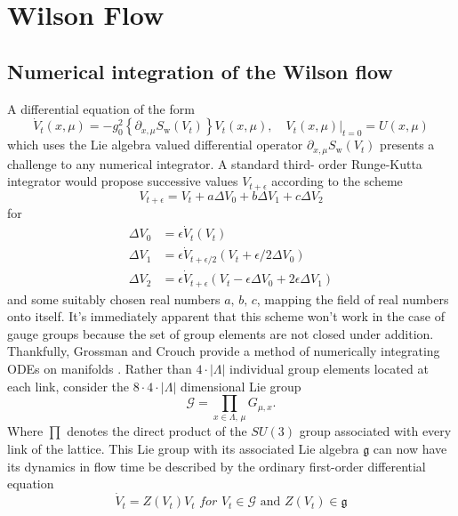 \documentclass[a4paper,10pt]{book}
\begin{document}
\section{Wilson Flow}

\subsection{Numerical integration of the Wilson flow}
A differential equation of the form 
\begin{equation}\label{eq:WF_diffeq}
\dot{V}_{t}(x, \mu)=-g_{0}^{2}\left\{\partial_{x, \mu} S_{\mathrm{w}}\left(V_{t}\right)\right\} V_{t}(x, \mu),\left.\quad V_{t}(x, \mu)\right|_{t=0}=U(x, \mu)
\end{equation}
which uses the Lie algebra valued differential operator $\partial_{x, \mu} S_{\mathrm{w}}\left(V_{t}\right)$ presents a challenge to any numerical integrator. A standard third- order Runge-Kutta integrator would  propose successive values $V_{t+\epsilon}$ according to the scheme 
$$
V_{t+\epsilon} = V_{t}+a\Delta V_0+b\Delta V_1 + c\Delta V_2
$$
for
\begin{equation*}
\begin{aligned} 
\Delta V_0 &= \epsilon \dot{V}_{t}\left( V_{t} \right)\\
\Delta V_1 &= \epsilon \dot{V}_{t+\epsilon/2}\left( V_{t} +\epsilon/2 \Delta V_0\right)\\
\Delta V_2 &= \epsilon \dot{V}_{t+\epsilon}\left( V_{t} -\epsilon \Delta V_0 + 2\epsilon\Delta V_1 \right)
\end{aligned}
\end{equation*}
and some suitably chosen real numbers $a,\,b,\,c$, mapping the field of real numbers onto itself. It's immediately apparent that this scheme won't work in the case of gauge groups because the set of group elements are not closed under addition.\\Thankfully, Grossman and Crouch provide a method of numerically integrating ODEs on manifolds \cite{CrouchP.E.1993Nioo}. Rather than $4\cdot\left| \Lambda \right|$ individual group elements located at each link, consider the $8\cdot4\cdot\left| \Lambda \right|$ dimensional Lie group $$\mathcal{G} =\prod\limits_{x\in \Lambda ,\,\mu}\!\!\!G_{\mu,x}.$$ Where $\prod$ denotes the direct product of the $SU(3)$ group associated with every link of the lattice. This Lie group with its associated Lie algebra $\mathfrak{g}$ can now have its dynamics in flow time be described by the ordinary first-order differential equation
\begin{equation}
\dot{V}_{t}=Z\left(V_{t}\right) V_{t}\,\,for\,\,V_{t} \in \mathcal{G} \text { and } Z\left(V_{t}\right) \in \mathfrak{g}
\end{equation}
\end{document}
